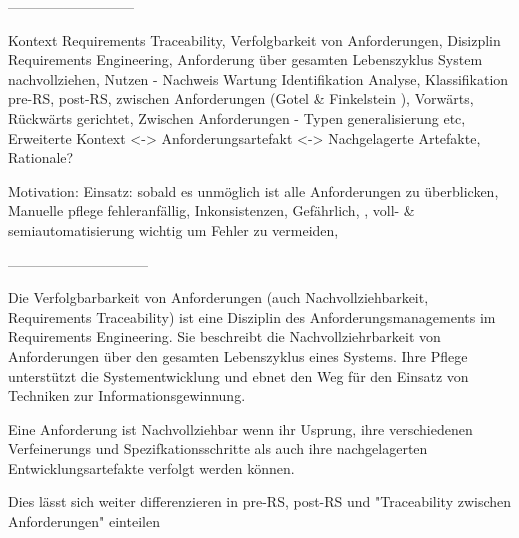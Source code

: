 ---------------------------


Kontext
Requirements Traceability, Verfolgbarkeit von Anforderungen, Disizplin Requirements Engineering, Anforderung über gesamten Lebenszyklus System nachvollziehen, Nutzen - Nachweis Wartung Identifikation Analyse, Klassifikation pre-RS, post-RS, zwischen Anforderungen (Gotel & Finkelstein ), Vorwärts, Rückwärts gerichtet, Zwischen Anforderungen - Typen generalisierung etc, Erweiterte Kontext <-> Anforderungsartefakt <-> Nachgelagerte Artefakte, Rationale? \cite{Pohl2015BasiswissenIREB-Standard,Pohl2008RequirementsTechniken, Pohl2010RequirementsTechniques}

Motivation:
Einsatz: sobald es unmöglich ist alle Anforderungen zu überblicken, Manuelle pflege fehleranfällig, Inkonsistenzen, Gefährlich, , voll- & semiautomatisierung wichtig um Fehler zu vermeiden, 

------------------------------

Die Verfolgbarbarkeit von Anforderungen (auch Nachvollziehbarkeit, Requirements Traceability) ist eine Disziplin des Anforderungsmanagements im Requirements Engineering. Sie beschreibt die Nachvollziehrbarkeit von Anforderungen über den gesamten Lebenszyklus eines Systems. Ihre Pflege unterstützt die Systementwicklung und ebnet den Weg für den Einsatz von Techniken zur Informationsgewinnung.

Eine Anforderung ist Nachvollziehbar wenn ihr Usprung, ihre verschiedenen Verfeinerungs und Spezifkationsschritte als auch ihre nachgelagerten Entwicklungsartefakte verfolgt werden können.


Dies lässt sich weiter differenzieren in pre-RS, post-RS und "Traceability zwischen Anforderungen" einteilen \cite{Gotel1994AnProblem}



